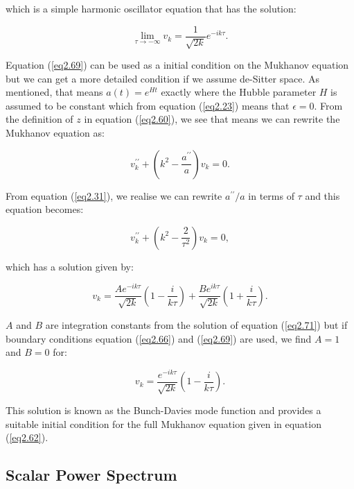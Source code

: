 \documentclass[a4paper,12pt,twoside]{report}
\begin{document}
which is a simple harmonic oscillator equation that has the solution:

\begin{equation} \label{eq2.69}
\lim_{\tau \rightarrow - \infty}v_{k} = \frac{1}{\sqrt{2k}} e^{-ik\tau}.
\end{equation}

Equation (\ref{eq2.69}) can be used as a initial condition on the Mukhanov equation but we can get a more detailed condition if we assume de-Sitter space. As mentioned, that means $a(t) = e^{Ht}$ exactly where the Hubble parameter $H$ is assumed to be constant which from equation (\ref{eq2.23}) means that $\epsilon = 0$. From the definition of $z$ in equation (\ref{eq2.60}), we see that means we can rewrite the Mukhanov equation as:

\begin{equation} \label{eq2.70}
v_{k}^{\prime \prime} + \left( k^{2} - \frac{a^{\prime \prime}}{a} \right) v_{k} = 0.
\end{equation}

From equation (\ref{eq2.31}), we realise we can rewrite $a^{\prime \prime}/a$ in terms of $\tau$ and this equation becomes:

\begin{equation} \label{eq2.71}
v_{k}^{\prime \prime} + \left( k^{2} - \frac{2}{\tau^{2}} \right) v_{k} = 0,
\end{equation}

which has a solution given by:

\begin{equation} \label{eq2.72}
v_{k} = \frac{A e^{-ik\tau}}{\sqrt{2k}} \left( 1 - \frac{i}{k \tau} \right) + \frac{B e^{ik\tau}}{\sqrt{2k}} \left( 1 + \frac{i}{k \tau} \right).
\end{equation}

$A$ and $B$ are integration constants from the solution of equation (\ref{eq2.71}) but if boundary conditions equation (\ref{eq2.66}) and (\ref{eq2.69}) are used, we find $A = 1$ and $B = 0$ for:

\begin{equation} \label{eq2.73}
v_{k} = \frac{e^{-ik\tau}}{\sqrt{2k}} \left( 1 - \frac{i}{k \tau} \right).
\end{equation}

This solution is known as the Bunch-Davies mode function and provides a suitable initial condition for the full Mukhanov equation given in equation (\ref{eq2.62}). 

\subsection{Scalar Power Spectrum} \label{subsec:ScalPowSpec}
\end{document}
